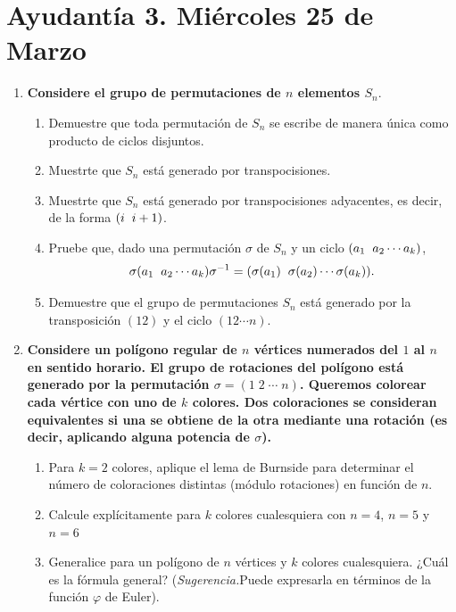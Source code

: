 \documentclass{article}
\theoremstyle{definition}
\theoremstyle{remark}
\numberwithin{equation}{section}
\begin{document}
\newpage
\section{Ayudantía 3. Miércoles 25 de Marzo}


\begin{enumerate}
\item \textbf{Considere el grupo de permutaciones de $n$ elementos $S_n$}.\\

\begin{enumerate}
\item Demuestre que toda permutación de $S_n$ se escribe de manera única como producto de ciclos disjuntos.
\item Muestrte que $S_n$ está generado por transpocisiones.
\item Muestrte que $S_n$ está generado por transpocisiones adyacentes, es decir, de la forma $(i \hspace{0.2cm} i+1)$.
\item Pruebe que, dado una permutación $\sigma$ de $S_n$ y un ciclo $(a_1 \hspace{0.2cm} a_2 \cdots a_k)$,
$$\sigma(a_1 \hspace{0.2cm} a_2 \cdots a_k)\sigma^{-1}=(\sigma(a_1) \hspace{0.2cm} \sigma(a_2) \cdots \sigma (a_k)).$$
\item Demuestre que el grupo de permutaciones $S_n$ está generado por la transposición $(1 2)$ y el ciclo $(1 2 \cdots n)$.
\end{enumerate}
\item \textbf{Considere un polígono regular de \(n\) vértices numerados del \(1\) al \(n\) en sentido horario. El grupo de rotaciones del polígono está generado por la permutación \(\sigma = (1\;2\;\cdots\;n)\). Queremos colorear cada vértice con uno de \(k\) colores. Dos coloraciones se consideran equivalentes si una se obtiene de la otra mediante una rotación (es decir, aplicando alguna potencia de \(\sigma\)).}

\begin{enumerate}
\item Para \(k=2\) colores, aplique el lema de Burnside para determinar el número de coloraciones distintas (módulo rotaciones) en función de \(n\).
\item Calcule explícitamente para \(k\) colores cualesquiera con \(n = 4\), \(n = 5\) y \(n = 6\)
\item Generalice para un polígono de \(n\) vértices y \(k\) colores cualesquiera. ¿Cuál es la fórmula general? (\textit{Sugerencia.}Puede expresarla en términos de la función \(\varphi\) de Euler).
\end{enumerate}
\end{enumerate}
\end{document}
